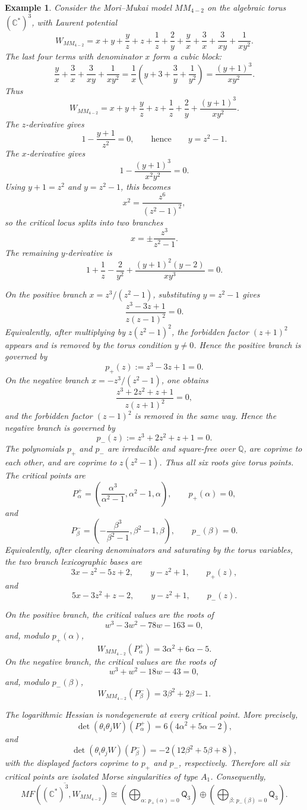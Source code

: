 \documentclass[11pt]{amsart}
\newtheorem{example}{Example}[section]
\newcommand{\MorseCat}[1]{\mathsf{Q}_{#1}}
\begin{document}
\begin{example}
Consider the Mori--Mukai model $MM_{4-2}$ on the algebraic torus
$(\mathbb{C}^*)^3$, with Laurent potential
\[
W_{MM_{4-2}}=x+y+\frac{y}{z}+z+\frac{1}{z}+\frac{2}{y}
+\frac{y}{x}+\frac{3}{x}+\frac{3}{xy}+\frac{1}{xy^2}.
\]
The last four terms with denominator $x$ form a cubic block:
\[
\frac{y}{x}+\frac{3}{x}+\frac{3}{xy}+\frac{1}{xy^2}
=\frac{1}{x}\left(y+3+\frac{3}{y}+\frac{1}{y^2}\right)
=\frac{(y+1)^3}{xy^2}.
\]
Thus
\[
W_{MM_{4-2}}=x+y+\frac{y}{z}+z+\frac{1}{z}+\frac{2}{y}
+\frac{(y+1)^3}{xy^2}.
\]
The $z$-derivative gives
\[
1-\frac{y+1}{z^2}=0,
\qquad\text{hence}\qquad
y=z^2-1.
\]
The $x$-derivative gives
\[
1-\frac{(y+1)^3}{x^2y^2}=0.
\]
Using $y+1=z^2$ and $y=z^2-1$, this becomes
\[
x^2=\frac{z^6}{(z^2-1)^2},
\]
so the critical locus splits into two branches
\[
x=\pm\frac{z^3}{z^2-1}.
\]
The remaining $y$-derivative is
\[
1+\frac{1}{z}-\frac{2}{y^2}
+\frac{(y+1)^2(y-2)}{xy^3}=0.
\]

On the positive branch $x=z^3/(z^2-1)$, substituting $y=z^2-1$ gives
\[
\frac{z^3-3z+1}{z(z-1)^2}=0.
\]
Equivalently, after multiplying by $z(z^2-1)^2$, the forbidden factor
$(z+1)^2$ appears and is removed by the torus condition $y\neq0$. Hence the
positive branch is governed by
\[
p_+(z):=z^3-3z+1=0.
\]
On the negative branch $x=-z^3/(z^2-1)$, one obtains
\[
\frac{z^3+2z^2+z+1}{z(z+1)^2}=0,
\]
and the forbidden factor $(z-1)^2$ is removed in the same way. Hence the
negative branch is governed by
\[
p_-(z):=z^3+2z^2+z+1=0.
\]
The polynomials $p_+$ and $p_-$ are irreducible and square-free over
$\mathbb{Q}$, are coprime to each other, and are coprime to $z(z^2-1)$. Thus
all six roots give torus points. The critical points are
\[
P^+_\alpha=\left(
\frac{\alpha^3}{\alpha^2-1},\alpha^2-1,\alpha
\right),
\qquad
p_+(\alpha)=0,
\]
and
\[
P^-_\beta=\left(
-\frac{\beta^3}{\beta^2-1},\beta^2-1,\beta
\right),
\qquad
p_-(\beta)=0.
\]
Equivalently, after clearing denominators and saturating by the torus variables,
the two branch lexicographic bases are
\[
3x-z^2-5z+2,
\qquad
y-z^2+1,
\qquad
p_+(z),
\]
and
\[
5x-3z^2+z-2,
\qquad
y-z^2+1,
\qquad
p_-(z).
\]

On the positive branch, the critical values are the roots of
\[
w^3-3w^2-78w-163=0,
\]
and, modulo $p_+(\alpha)$,
\[
W_{MM_{4-2}}(P^+_\alpha)=3\alpha^2+6\alpha-5.
\]
On the negative branch, the critical values are the roots of
\[
w^3+w^2-18w-43=0,
\]
and, modulo $p_-(\beta)$,
\[
W_{MM_{4-2}}(P^-_\beta)=3\beta^2+2\beta-1.
\]

The logarithmic Hessian is nondegenerate at every critical point. More
precisely,
\[
\det(\theta_i\theta_jW)(P^+_\alpha)
=6(4\alpha^2+5\alpha-2),
\]
and
\[
\det(\theta_i\theta_jW)(P^-_\beta)
=-2(12\beta^2+5\beta+8),
\]
with the displayed factors coprime to $p_+$ and $p_-$, respectively. Therefore
all six critical points are isolated Morse singularities of type $A_1$.
Consequently,
\[
\overline{MF((\mathbb{C}^*)^3,W_{MM_{4-2}})}
\cong \left(\bigoplus_{\alpha:\,p_+(\alpha)=0}\MorseCat{3}\right) \oplus \left(\bigoplus_{\beta:\,p_-(\beta)=0}\MorseCat{3}\right).
\]
\end{example}
\end{document}
